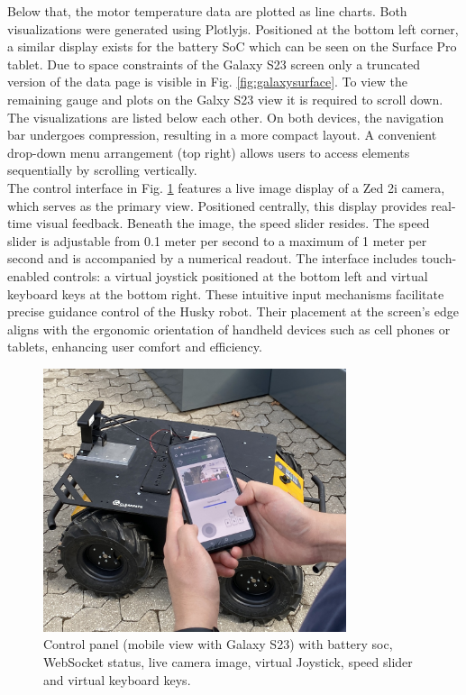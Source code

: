 \documentclass[conference]{IEEEtran}
\begin{document}
Below that, the motor temperature data are plotted as line charts. Both visualizations were generated using Plotlyjs.
Positioned at the bottom left corner, a similar display exists for the battery SoC which can be seen on the Surface Pro tablet. Due to space constraints of the Galaxy S23 screen only a truncated version of the data page is visible in Fig. \ref{fig:galaxysurface}. To view the remaining gauge and plots on the Galxy S23 view it is required to scroll down. The visualizations are listed below each other.  
On both devices, the navigation bar undergoes compression, resulting in a more compact layout.
A convenient drop-down menu arrangement (top right) allows users to access elements sequentially by scrolling vertically.\\
The control interface in Fig. \ref{fig:galaxycontrol} features a live image display of a Zed 2i camera, which serves as the primary view. Positioned centrally, this display provides real-time visual feedback. Beneath the image, the speed slider resides. The speed slider is adjustable from 0.1 meter per second to a maximum of 1 meter per second and is accompanied by a numerical readout.
The interface includes touch-enabled controls: a virtual joystick positioned at the bottom left and virtual keyboard keys at the bottom right. These intuitive input mechanisms facilitate precise guidance control of the Husky robot. 
Their placement at the screen's edge aligns with the ergonomic orientation of handheld devices such as cell phones or tablets, enhancing user comfort and efficiency. 
\begin{figure}[htbp]
    \centerline{\includegraphics[width=8.9cm]{Pictures/galaxycontrol.jpg}}
    \caption{Control panel (mobile view with Galaxy S23) with battery soc, WebSocket status, live camera image, virtual Joystick, speed slider and virtual keyboard keys.}
    \label{fig:galaxycontrol}
\end{figure}
\end{document}
